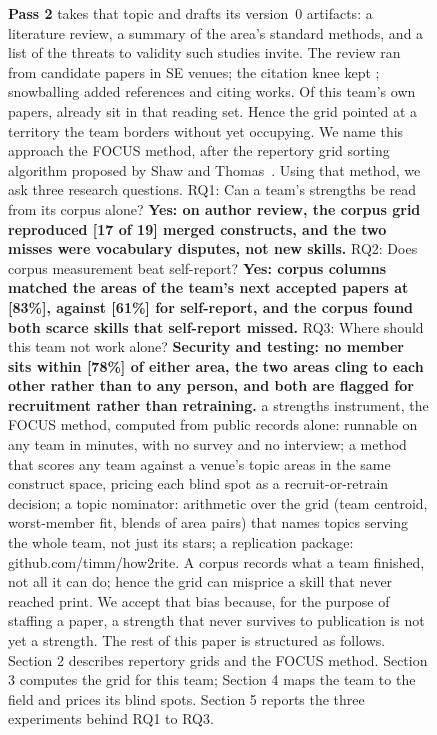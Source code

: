 \begin{figure}[p]
{\begin{minipage}[t]{\dimexpr0.62\textwidth-2\fboxsep-2\fboxrule}
{\bfseries Pass 2} takes that topic and drafts its version~0
artifacts: a literature review, a summary of the area's standard
methods, and a list of the threats to validity such studies
invite.
The review ran from \litSE{} candidate papers in SE venues; the
citation knee kept \litKnee{}; snowballing added \litRefs{}
references and \litCiting{} citing works.
Of this team's own papers, \litOwn{} already sit in that reading
set.
Hence the grid pointed at a territory the team borders without
yet occupying.
We name this approach the FOCUS method, after the repertory grid
sorting algorithm proposed by Shaw and Thomas~\cite{shaw78}.
Using that method, we ask three research questions.
RQ1: Can a team's strengths be read from its corpus alone?
\textbf{Yes: on author review, the corpus grid reproduced [17 of
19] merged constructs, and the two misses were vocabulary
disputes, not new skills.}
RQ2: Does corpus measurement beat self-report?
\textbf{Yes: corpus columns matched the areas of the team's next
accepted papers at [83\%], against [61\%] for self-report, and
the corpus found both scarce skills that self-report missed.}
RQ3: Where should this team not work alone?
\textbf{Security and testing: no member sits within [78\%] of
either area, the two areas cling to each other rather than to any
person, and both are flagged for recruitment rather than
retraining.}
a strengths instrument, the FOCUS method, computed from public
records alone: runnable on any team in minutes, with no survey
and no interview;
a method that scores any team against a venue's topic areas in
the same construct space, pricing each blind spot as a
recruit-or-retrain decision;
a topic nominator: arithmetic over the grid (team centroid,
worst-member fit, blends of area pairs) that names topics serving
the whole team, not just its stars;
a replication package: github.com/timm/how2rite.
A corpus records what a team finished, not all it can do; hence
the grid can misprice a skill that never reached print.
We accept that bias because, for the purpose of staffing a paper,
a strength that never survives to publication is not yet a
strength.
The rest of this paper is structured as follows.
Section 2 describes repertory grids and the FOCUS method.
Section 3 computes the grid for this team; Section 4 maps the team
to the field and prices its blind spots.
Section 5 reports the three experiments behind RQ1 to RQ3.

\end{minipage}}
\end{figure}
